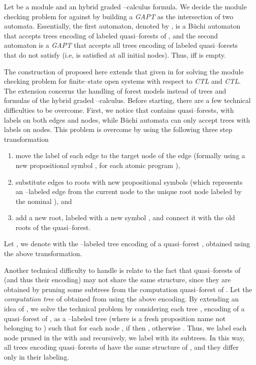 \documentclass{LMCS}
\theoremstyle{plain}
\def \CTL           {\emph{CTL}\xspace}
\def \CTLSTAR       {\emph{CTL}\xspace}
\def \GAPT          {\emph{GAPT}\xspace}
\begin{document}
Let  be a module and  an hybrid graded
--calculus formula. We decide the module checking problem for
 against  by building a \GAPT  as the intersection of two automata.
Essentially, the first automaton, denoted by , is a
B\"{u}chi automaton that accepts trees encoding of labeled
quasi--forests of , and the second automaton is a \GAPT
 that accepts all trees encoding of
labeled quasi--forests that do not satisfy  (i.e,  is satisfied at all initial nodes). Thus,  iff  is empty.

The construction of  proposed here extends that given in
\cite{KVW01} for solving the module checking problem for
finite--state open systems with respect to \CTL and \CTLSTAR. The
extension concerns the handling of forest models instead of trees
and formulas of the hybrid graded --calculus. Before
starting, there are a few technical difficulties to be overcome.
First, we notice that  contains quasi--forests, with
labels on both edges and nodes, while B\"{u}chi automata can only
accept trees with labels on nodes. This problem is overcome by
using the following three step transformation
\begin{enumerate}[(1)]
\item
move the label of each edge to the target node of the edge (formally using a
new propositional symbol , for each atomic program ),

\item
substitute edges to roots with new propositional symbols 
(which represents an --labeled edge from the current node to the unique
root node labeled by the nominal ), and

\item
add a new root, labeled with a new symbol , and connect it with the old roots of the quasi--forest.
\end{enumerate}

Let , we denote
with  the --labeled tree
encoding of a quasi--forest , obtained using
the above transformation.

Another technical difficulty to handle is relate to the fact that
quasi--forests of  (and thus their encoding) may not share the same
structure, since they are obtained by pruning some subtrees from the
computation quasi--forest  of . Let
 the \emph{computation tree} of  obtained from
 using the above encoding. By extending
an idea of \cite{KVW01}, we solve the technical problem by considering each
tree , encoding of a quasi--forest of , as a
--labeled tree 
(where  is a fresh proposition name not belonging to ) such that for each node , if  then , otherwise . Thus, we label each node
pruned in the  with  and recursively, we
label with  its subtrees. In this way, all trees encoding
quasi--forests of  have the same structure of
, and they differ only in their labeling.
\end{document}
